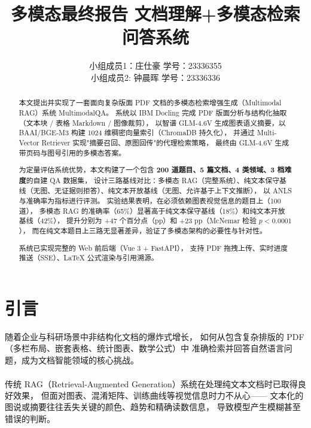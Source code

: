 ﻿\documentclass[UTF8, heading=true]{ctexart}
\title{\LARGE \textbf{多模态最终报告 \hspace{0.2cm} 文档理解+多模态检索问答系统}}
\date{}
\author{小组成员1：庄仕豪 \qquad 学号：23336355 \\ 小组成员2: 钟晨晖 \qquad 学号：23336336}
\newcommand{\upcite}[1]{\textsuperscript{\textsuperscript{\cite{#1}}}}
\begin{document}
\maketitle
\vspace{-1.5cm}

\begin{abstract}
本文提出并实现了一套面向复杂版面 PDF 文档的多模态检索增强生成（Multimodal RAG）系统 MultimodalQA。
系统以 IBM Docling 完成 PDF 版面分析与结构化抽取（文本块 / 表格 Markdown / 图像裁剪），
以智谱 GLM-4.6V 生成图表语义摘要，以 BAAI/BGE-M3 构建 1024 维稠密向量索引（ChromaDB 持久化），
并通过 Multi-Vector Retriever 实现"摘要召回、原图回传"的代理检索策略，
最终由 GLM-4.6V 生成带页码与图号引用的多模态答案。

为定量评估系统优势，本文构建了一个包含 \textbf{200 道题目、5 篇文档、4 类领域、3 档难度}的自建 QA 数据集，
设计三路基线对比：多模态 RAG（完整系统）、纯文本保守基线（无图、无证据则拒答）、纯文本开放基线（无图、允许基于上下文推断），
以 ANLS 与准确率为指标进行评测。
实验结果表明，在必须依赖图表视觉信息的题目上（100 道），
多模态 RAG 的准确率（65\%）显著高于纯文本保守基线（18\%）和纯文本开放基线（42\%），
提升分别为 +47 个百分点（pp）和 +23 pp（McNemar 检验 $p<0.0001$），
而在纯文本题目上三路无显著差异，验证了多模态架构的必要性与针对性。

系统已实现完整的 Web 前后端（Vue 3 + FastAPI），
支持 PDF 拖拽上传、实时进度推送（SSE）、LaTeX 公式渲染与引用溯源。
\end{abstract}

\tableofcontents
\newpage

\section{引言}

随着企业与科研场景中非结构化文档的爆炸式增长，
如何从包含复杂排版的 PDF（多栏布局、嵌套表格、统计图表、数学公式）中
准确检索并回答自然语言问题，成为文档智能领域的核心挑战。

传统 RAG（Retrieval-Augmented Generation）系统\upcite{lewis2020rag}在处理纯文本文档时已取得良好效果，
但面对图表、混淆矩阵、训练曲线等视觉信息时力不从心——
文本化的图说或摘要往往丢失关键的颜色、趋势和精确读数信息，
导致模型产生模糊甚至错误的判断。
\end{document}
